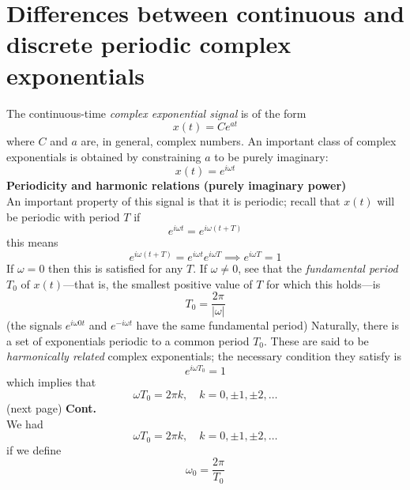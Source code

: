 \documentclass{report}
\begin{document}
\section{Differences between continuous and\\discrete periodic complex exponentials}
The continuous-time \textit{complex exponential signal} is of the form
\begin{equation*}
x(t)=Ce^{at}
\end{equation*}
where $C$ and $a$ are, in general, complex numbers. An important class of complex exponentials is obtained by constraining $a$ to be purely imaginary:
\begin{equation*}
x(t)=e^{i\omega t}
\end{equation*}
\textbf{Periodicity and harmonic relations (purely imaginary power)}\\
An important property of this signal is that it is periodic; recall that $x(t)$ will be periodic with period $T$ if
\begin{equation*}
e^{i\omega t}=e^{i\omega(t+T)}
\end{equation*}
this means
\begin{equation*}
e^{i\omega(t+T)}=e^{i\omega t}e^{i\omega T}\implies
e^{i\omega T}=1
\end{equation*}
If $\omega=0$ then this is satisfied for any $T$. If $\omega\neq0$, see that the \textit{fundamental period} 
$T_0$ of $x(t)$---that is, the smallest positive value of $T$ for which this holds---is
\begin{equation*}
T_0=\frac{2\pi}{|\omega|}
\end{equation*}
(the signals $e^{i\omega 0t}$ and $e^{-i\omega t}$ have the same fundamental period)
Naturally, there is a set of exponentials periodic to a common period $T_0$. These are said to be
\textit{harmonically related} complex exponentials; the necessary condition they satisfy is
\begin{equation*}
e^{i\omega T_0}=1
\end{equation*}
which implies that
\begin{equation*}
\omega T_0=2\pi k,\quad k=0,\pm1,\pm2,\ldots
\end{equation*}
(next page)\newpage
\noindent\textbf{Cont.}\\
We had
\begin{equation*}
\omega T_0=2\pi k,\quad k=0,\pm1,\pm2,\ldots
\end{equation*}
if we define
\begin{equation*}
\omega_0=\frac{2\pi}{T_0}
\end{equation*}
\end{document}

